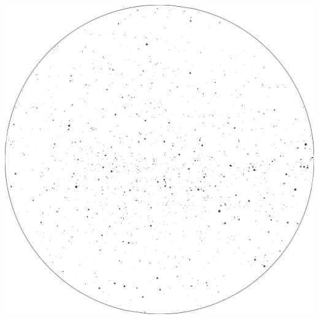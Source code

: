 \documentclass{./SAS-class-skygen}
\begin{document}
	\vspace{0.5cm}
    \begin{center}
    \includegraphics[width=\textwidth]{./pics/skychart29.png}
    \end{center}
    
    
\end{document}
